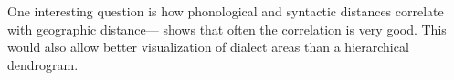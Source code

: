 \documentclass[11pt]{article}
\begin{document}

One interesting question is
how phonological and syntactic distances correlate with geographic
distance--- shows that often the correlation is
very good. This would also allow better visualization of dialect areas
than a hierarchical dendrogram.



\end{document}
